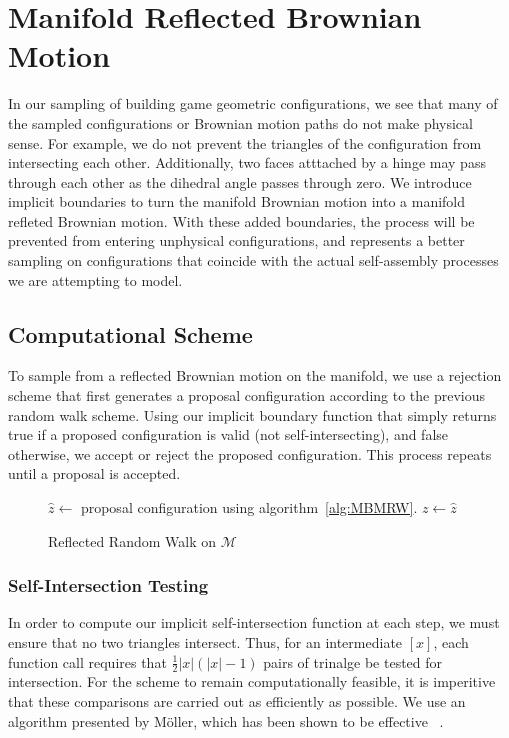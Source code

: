 \section{Manifold Reflected Brownian Motion}
In our sampling of building game geometric configurations, we see that many of the sampled configurations or Brownian motion paths do not make physical sense. For example, we do not prevent the triangles of the configuration from intersecting each other. Additionally, two faces atttached by a hinge may pass through each other as the dihedral angle passes through zero. We introduce implicit boundaries to turn the manifold Brownian motion into a manifold refleted Brownian motion. With these added boundaries, the process will be prevented from entering unphysical configurations, and represents a better sampling on configurations that coincide with the actual self-assembly processes we are attempting to model.

\subsection{Computational Scheme}

To sample from a reflected Brownian motion on the manifold, we use a rejection scheme that first generates a proposal configuration according to the previous random walk scheme. Using our implicit boundary function that simply returns true if a proposed configuration is valid (not self-intersecting), and false otherwise, we accept or reject the proposed configuration. This process repeats until a proposal is accepted. 

\begin{figure}[ht]
\centering
\begin{algorithmic}
\Do 
\State $\hat{z} \gets$ proposal configuration using algorithm~\ref{alg:MBMRW}.
\State $z \gets \hat{z}$
\end{algorithmic}
\caption{Reflected Random Walk on $\mathcal{M}$}
\end{figure}

\subsubsection{Self-Intersection Testing}

In order to compute our implicit self-intersection function at each step, we must ensure that no two triangles intersect. Thus, for an intermediate $[x]$, each function call requires that $\frac{1}{2}|x|(|x| - 1)$ pairs of trinalge be tested for intersection. For the scheme to remain computationally feasible, it is imperitive that these comparisons are carried out as efficiently as possible. We use an algorithm presented by M\"oller, which has been shown to be effective ~\cite{Möller97afast}.

